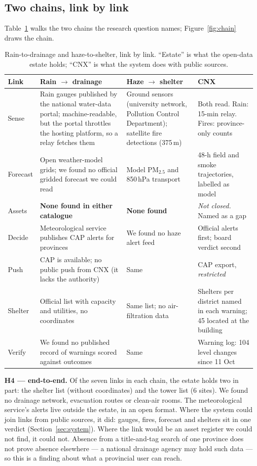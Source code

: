 \documentclass[10pt,twocolumn,a4paper]{article}
\begin{document}
\subsection{Two chains, link by link}
Table~\ref{tab:chains} walks the two chains the research question names; Figure~\ref{fig:chain} draws the chain.
\begin{table}[!t]
\centering\small
\caption{Rain-to-drainage and haze-to-shelter, link by link. ``Estate'' is what the open-data estate holds; ``CNX'' is what the system does with public sources.}\label{tab:chains}
\begin{tabularx}{\textwidth}{@{}p{2.1cm}XXX@{}}
\toprule
\textbf{Link} & \textbf{Rain $\to$ drainage} & \textbf{Haze $\to$ shelter} & \textbf{CNX}\\\midrule
Sense & Rain gauges published by the national water-data portal; machine-readable, but the portal throttles the hosting platform, so a relay fetches them & Ground sensors (university network, Pollution Control Department); satellite fire detections (375\,m) & Both read. Rain: 15-min relay. Fires: province-only counts\\
Forecast & Open weather-model grids; we found no official gridded forecast we could read & Model PM$_{2.5}$ and 850\,hPa transport & 48-h field and smoke trajectories, labelled as model\\
Assets & \textbf{None found in either catalogue} & \textbf{None found} & \emph{Not closed.} Named as a gap\\
Decide & Meteorological service publishes CAP alerts for provinces \citep{tmd2026cap} & We found no haze alert feed & Official alerts first; board verdict second\\
Push & CAP is available; no public push from CNX (it lacks the authority) & Same & CAP export, \emph{restricted}\\
Shelter & Official list with capacity and utilities, no coordinates & Same list; no air-filtration data & Shelters per district named in each warning; 45 located at the building\\
Verify & We found no published record of warnings scored against outcomes & Same & Warning log: 104 level changes since 11 Oct\\\bottomrule
\end{tabularx}
\end{table}
\textbf{H4 --- end-to-end.} Of the seven links in each chain, the estate holds two in part: the shelter list (without coordinates) and the tower list (6 sites). We found no drainage network, evacuation routes or clean-air rooms. The meteorological service\textquoteright s alerts live outside the estate, in an open format. Where the system could join links from public sources, it did: gauges, fires, forecast and shelters sit in one verdict (Section~\ref{sec:system}). Where the link would be an asset register we could not find, it could not. Absence from a title-and-tag search of one province does not prove absence elsewhere --- a national drainage agency may hold such data --- so this is a finding about what a provincial user can reach.
\end{document}
